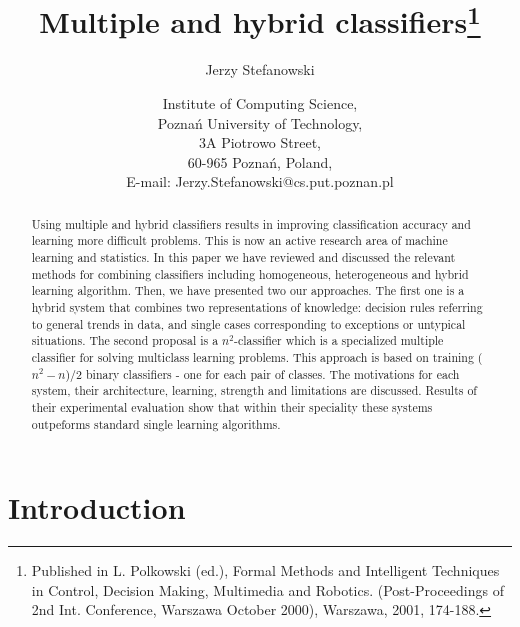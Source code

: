 \documentclass{article}
\begin{document}
\title{Multiple and hybrid classifiers\thanks{Published in
L. Polkowski (ed.), Formal Methods and Intelligent Techniques in
Control, Decision Making, Multimedia and Robotics.
(Post-Proceedings of 2nd Int. Conference, Warszawa October 2000),
Warszawa, 2001, 174-188. }}
\author{Jerzy Stefanowski}
\date{Institute of Computing Science,\\
Pozna\'n University of Technology, \\
3A Piotrowo Street,\\
60-965 Pozna\'n, Poland,\\
E-mail: Jerzy.Stefanowski@cs.put.poznan.pl}

\maketitle

\begin{abstract}
Using multiple and hybrid classifiers results in improving
classification accuracy and learning more difficult problems. This
is now an active research area of machine learning and statistics.
In this paper we have reviewed and discussed the relevant methods
for combining classifiers including homogeneous, heterogeneous and
hybrid learning algorithm. Then, we have presented two our
approaches. The first one is a hybrid system that combines two
representations of knowledge: decision rules referring to general
trends in data, and single cases corresponding to exceptions or
untypical situations. The second proposal is a $n^2$-classifier
which is a specialized multiple classifier for solving multiclass
learning problems. This approach is based on training ($n^2-n$)/2
binary classifiers - one for each pair of classes. The motivations
for each system, their architecture, learning, strength and
limitations are discussed. Results of their experimental
evaluation show that within their speciality these systems
outpeforms standard single learning algorithms.
\end{abstract}

\section{Introduction}
\end{document}
